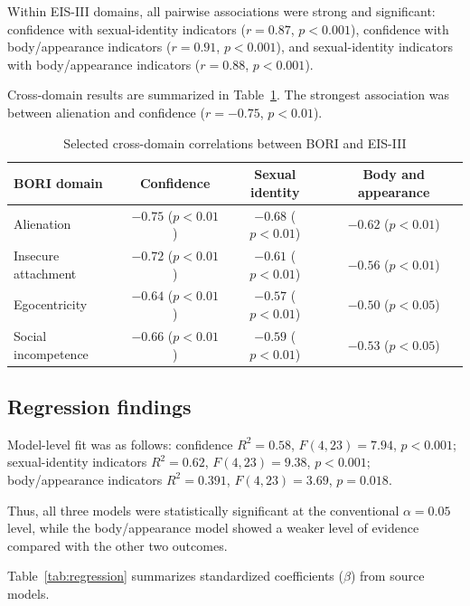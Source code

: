 \documentclass[12pt]{article}
\begin{document}
Within EIS-III domains, all pairwise associations were strong and significant: confidence with sexual-identity indicators ($r=0.87$, $p<0.001$), confidence with body/appearance indicators ($r=0.91$, $p<0.001$), and sexual-identity indicators with body/appearance indicators ($r=0.88$, $p<0.001$).

Cross-domain results are summarized in Table~\ref{tab:crosscorr}. The strongest association was between alienation and confidence ($r=-0.75$, $p<0.01$).

\begin{table}[htbp]
\centering
\caption{Selected cross-domain correlations between BORI and EIS-III}
\label{tab:crosscorr}
\small
\begin{tabular}{lccc}
\toprule
BORI domain & Confidence & Sexual identity & Body and appearance \\
\midrule
Alienation & $-0.75$ ($p<0.01$) & $-0.68$ ($p<0.01$) & $-0.62$ ($p<0.01$) \\
Insecure attachment & $-0.72$ ($p<0.01$) & $-0.61$ ($p<0.01$) & $-0.56$ ($p<0.01$) \\
Egocentricity & $-0.64$ ($p<0.01$) & $-0.57$ ($p<0.01$) & $-0.50$ ($p<0.05$) \\
Social incompetence & $-0.66$ ($p<0.01$) & $-0.59$ ($p<0.01$) & $-0.53$ ($p<0.05$) \\
\bottomrule
\end{tabular}
\end{table}

\subsection{Regression findings}
Model-level fit was as follows: confidence $R^2=0.58$, $F(4,23)=7.94$, $p<0.001$; sexual-identity indicators $R^2=0.62$, $F(4,23)=9.38$, $p<0.001$; body/appearance indicators $R^2=0.391$, $F(4,23)=3.69$, $p=0.018$.

Thus, all three models were statistically significant at the conventional $\alpha=0.05$ level, while the body/appearance model showed a weaker level of evidence compared with the other two outcomes.

Table~\ref{tab:regression} summarizes standardized coefficients ($\beta$) from source models.
\end{document}
